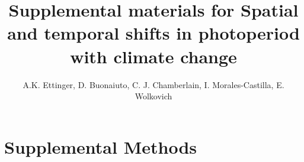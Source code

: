 \documentclass{article}
\begin{document}
 
\title{Supplemental materials for Spatial and temporal shifts in photoperiod with climate change} %

\author{A.K. Ettinger, D. Buonaiuto, C. J. Chamberlain, I. Morales-Castilla, E. Wolkovich}
\maketitle  %


\renewcommand{\thetable}{S\arabic{table}}

\section*{Supplemental Methods}
\end{document}
